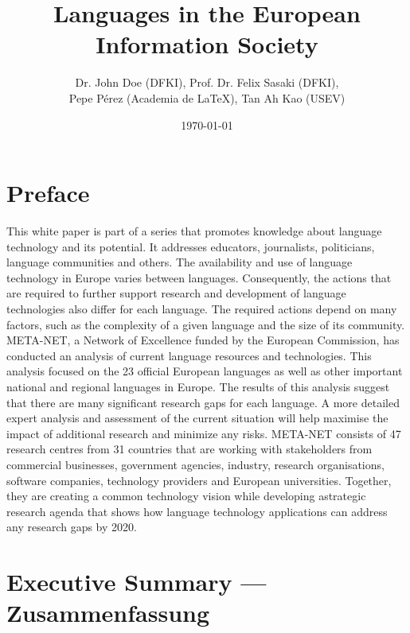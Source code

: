 \documentclass[]{../metanetpaper}
\title{Languages in the European Information Society}
\date{\today}
\author{Dr. John Doe (DFKI), Prof. Dr. Felix Sasaki (DFKI),\\
        Pepe Pérez (Academia de \LaTeX), Tan Ah Kao (USEV)}
\begin{document}
	\maketitle

	\section*{Preface}
This white paper is part of a series that promotes knowledge about
language technology and its potential. It addresses educators, journalists, politicians, language communities and others. The availability and use of language technology in Europe varies between languages. Consequently, the actions that are required to further support research and development of language technologies also differ for each language. The required actions depend on many factors, such as the complexity of a given language and the size of its community.
META-NET, a Network of Excellence funded by the European Commission, has conducted an analysis of current language resources and technologies. This analysis focused on the 23 official European languages as well as other important national and regional languages in Europe. The results of this analysis suggest that there are many significant research gaps for each language. A more detailed expert analysis and assessment of the current situation will help maximise the impact of additional research and minimize any risks. META-NET consists of 47 research centres from 31 countries that are working with stakeholders from commercial businesses, government agencies, industry, research organisations, software companies, technology providers and European universities. Together, they are creating a common technology vision while developing astrategic research agenda that shows how language technology applications can address any research gaps by 2020.

\clearpage

	\tableofcontents

	\clearpage
	\section{Executive Summary --- Zusammenfassung}
	
\end{document}
